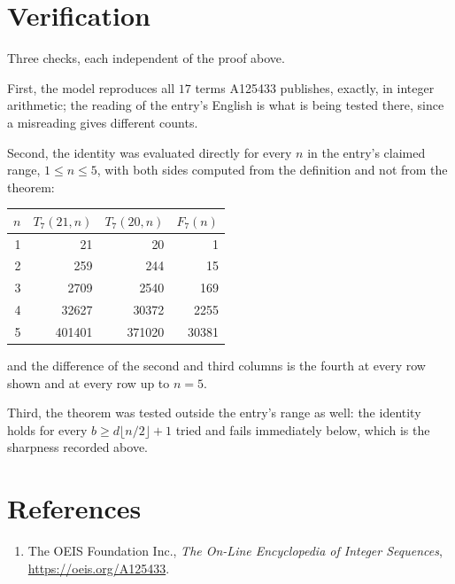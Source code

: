 \documentclass[11pt,a4paper]{article}
\theoremstyle{plain}
\theoremstyle{definition}
\begin{document}
\section{Verification}

Three checks, each independent of the proof above.

First, the model reproduces all $17$ terms A125433 publishes, exactly, in integer
arithmetic; the reading of the entry's English is what is being tested there, since a
misreading gives different counts.

Second, the identity was evaluated directly for every $n$ in the entry's claimed range,
$1\le n\le5$, with both sides computed from the definition and not from the theorem:

\begin{center}
\begin{tabular}{rrrr}
$n$ & $T_{7}(21,n)$ & $T_{7}(20,n)$ & $F_{7}(n)$ \\ \hline
1 & 21 & 20 & 1 \\
2 & 259 & 244 & 15 \\
3 & 2709 & 2540 & 169 \\
4 & 32627 & 30372 & 2255 \\
5 & 401401 & 371020 & 30381 \\
\end{tabular}
\end{center}

\noindent and the difference of the second and third columns is the fourth at every row shown
and at every row up to $n=5$.

Third, the theorem was tested outside the entry's range as well: the identity holds for every
$b\ge d\lfloor n/2\rfloor+1$ tried and fails immediately below, which is the sharpness recorded
above.

\section*{References}
\begin{enumerate}
\item The OEIS Foundation Inc., \emph{The On-Line Encyclopedia of Integer Sequences},
\url{https://oeis.org/A125433}.
\end{enumerate}
\end{document}
